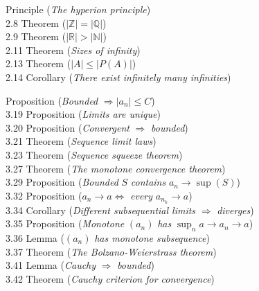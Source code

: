 \documentclass[12pt]{article}
\begin{document}
\vspace{0.5em}

 Principle (\emph{The hyperion principle})  \\
2.8 Theorem ($|\mathbb{Z}| = |\mathbb{Q}|$)  \\
2.9 Theorem ($|\mathbb{R}| > |\mathbb{N}|$)  \\
2.11 Theorem (\emph{Sizes of infinity})  \\
2.13 Theorem ($|A| \leq |P(A)|$)  \\
2.14 Corollary (\emph{There exist infinitely many infinities})  \\

\vspace{0.5em}

 Proposition (\emph{Bounded} $\Rightarrow |a_n| \leq C$)  \\
3.19 Proposition (\emph{Limits are unique})  \\
3.20 Proposition (\emph{Convergent} $\Rightarrow$ \emph{bounded})  \\
3.21 Theorem (\emph{Sequence limit laws})  \\
3.23 Theorem (\emph{Sequence squeeze theorem})  \\
3.27 Theorem (\emph{The monotone convergence theorem})  \\
3.29 Proposition (\emph{Bounded} $S$ \emph{contains} $a_n \to \sup(S)$)  \\
3.32 Proposition ($a_n \to a \Leftrightarrow$ \emph{every} $a_{n_k} \to a$)  \\
3.34 Corollary (\emph{Different subsequential limits} $\Rightarrow$ \emph{diverges})  \\
3.35 Proposition (\emph{Monotone} $(a_n)$ \emph{has} $\sup_n a \to a_n \to a$)  \\
3.36 Lemma ($(a_n)$ \emph{has monotone subsequence})  \\
3.37 Theorem (\emph{The Bolzano-Weierstrass theorem})  \\
3.41 Lemma (\emph{Cauchy} $\Rightarrow$ \emph{bounded})  \\
3.42 Theorem (\emph{Cauchy criterion for convergence})  \\

\vspace{0.5em}
\end{document}
